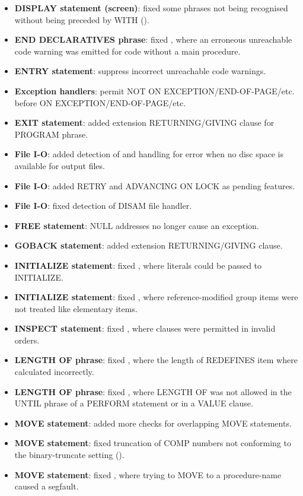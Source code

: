 \begin{itemize}
\item \textbf{DISPLAY statement (screen)}: fixed some phrases not being recognised without being preceded by WITH ().
\item \textbf{END DECLARATIVES phrase}: fixed , where an erroneous unreachable code warning was emitted for code without a main procedure.
\item \textbf{ENTRY statement}: suppress incorrect unreachable code warnings.
\item \textbf{Exception handlers}: permit NOT ON EXCEPTION\slash{}END-OF-PAGE\slash{}etc. before ON EXCEPTION\slash{}END-OF-PAGE\slash{}etc.
\item \textbf{EXIT statement}: added extension RETURNING\slash{}GIVING clause for PROGRAM phrase.
\item \textbf{File I-O}: added detection of and handling for error when no disc space is available for output files.
\item \textbf{File I-O}: added RETRY and ADVANCING ON LOCK as pending features.
\item \textbf{File I-O}: fixed detection of DISAM file handler.
\item \textbf{FREE statement}: NULL addresses no longer cause an exception.
\item \textbf{GOBACK statement}: added extension RETURNING\slash{}GIVING clause.
\item \textbf{INITIALIZE statement}: fixed , where literals could be passed to INITIALIZE.
\item \textbf{INITIALIZE statement}: fixed , where reference-modified group items were not treated like elementary items.
\item \textbf{INSPECT statement}: fixed , where clauses were permitted in invalid orders.
\item \textbf{LENGTH OF phrase}: fixed , where the length of REDEFINES item where calculated incorrectly.
\item \textbf{LENGTH OF phrase}: fixed , where LENGTH OF was not allowed in the UNTIL phrase of a PERFORM statement or in a VALUE clause.
\item \textbf{MOVE statement}: added more checks for overlapping MOVE statements.
\item \textbf{MOVE statement}: fixed truncation of COMP numbers not conforming to the binary-truncate setting ().
\item \textbf{MOVE statement}: fixed , where trying to MOVE to a procedure-name caused a segfault.

\end{itemize}
